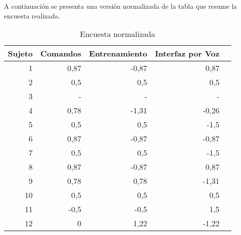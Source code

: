 A continuaci\'on se presenta una versi\'on normalizada de la tabla que resume la encuesta realizada.


\begin{table}[H] 
\centering
\footnotesize
\begin{tabular}{|r|r|r|r|r|}
\hline
    Sujeto &  Comandos & Entrenamiento & Interfaz por Voz \\
    \hline
1 &  0,87 &-0,87 & 0,87 \\
2 &  0,5  &0,5   & 0,5 \\
3 &  - & -  &  - \\
4 &  0,78 &-1,31 & -0,26 \\
5 &  0,5  &0,5   & -1,5 \\
6 &  0,87 &-0,87 & -0,87 \\
7 &  0,5  &0,5   & -1,5 \\
8 &  0,87 &-0,87 & 0,87  \\
9 &  0,78 &0,78  & -1,31  \\
10 & 0,5   &0,5   & 0,5  \\
11 & -0,5  &-0,5  & 1,5  \\
12 & 0      &1,22 & -1,22  \\
\hline
\end{tabular}
\caption{Encuesta normalizada}
\label{sec:tabla-encuesta-normalizada}
\end{table}

